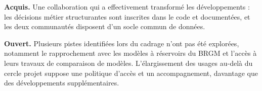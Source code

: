 \begin{acquisouvert}
\textbf{Acquis.} Une collaboration qui a effectivement transformé les développements : les
décisions métier structurantes sont inscrites dans le code et documentées, et les deux
communautés disposent d'un socle commun de données.

\textbf{Ouvert.} Plusieurs pistes identifiées lors du cadrage n'ont pas été explorées, notamment
le rapprochement avec les modèles à réservoirs du BRGM et l'accès à leurs travaux de
comparaison de modèles. L'élargissement des usages au-delà du cercle projet suppose une
politique d'accès et un accompagnement, davantage que des développements supplémentaires.
\end{acquisouvert}
